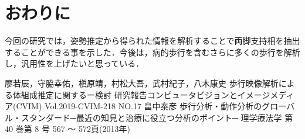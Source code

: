 \documentclass[a4j]{cis-resume}
\begin{document}
\section{おわりに} \label{sec:summary}
今回の研究では，姿勢推定から得られた情報を解析することで両脚支持相を抽出することができる事を示した．今後は，病的歩行を含むさらに多くの歩行を解析し，汎用性を上げたいと思っている．

\begin{thebibliography}{9}
   廖若辰，守脇幸佑，槇原靖，村松大吾，武村紀子，八木康史 歩行映像解析による体組成推定に関するー検討 研究報告コンピュータビジョンとイメージメディア(CVIM) Vol.2019-CVIM-218 NO.17
   畠中泰彦 歩行分析・動作分析のグローバル・スタンダード─最近の知見と治療に役立つ分析のポイント─ 理学療法学 第 40 巻第 8 号 567 ～ 572頁(2013年)
\end{thebibliography}
\end{document}

